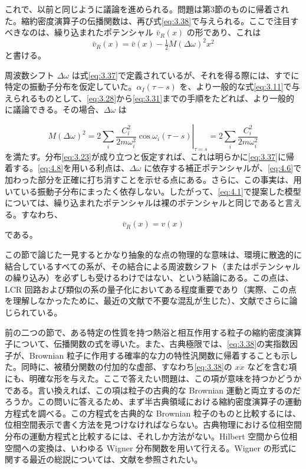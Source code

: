 これで、以前と同じように議論を進められる。問題は第3節のものに帰着された。縮約密度演算子の伝播関数は、再び式\eqref{eq:3.38}で与えられる。ここで注目すべきなのは、繰り込まれたポテンシャル $\bar v_R(x)$ の形であり、これは
\begin{equation}
\bar v_R(x)=\bar v(x)-\tfrac12 M(\Delta\omega)^2x^2
\tag{4.7}\label{eq:4.7}
\end{equation}
と書ける。

周波数シフト $\Delta\omega$ は式\eqref{eq:3.37}で定義されているが、それを得る際には、すでに特定の振動子分布を仮定していた。$\alpha_I(\tau-s)$ を、より一般的な式\eqref{eq:3.11}で与えられるものとして、\eqref{eq:3.28}から\eqref{eq:3.31}までの手順をたどれば、より一般的に議論できる。その場合、$\Delta\omega$ は

\begin{equation}
M(\Delta\omega)^2
=\left.2\sum_i\frac{C_i^2}{2m\omega_i^2}
\cos\omega_i(\tau-s)\right|_{\tau=s}
=2\sum_i\frac{C_i^2}{2m\omega_i^2}
\tag{4.8}\label{eq:4.8}
\end{equation}
を満たす。分布\eqref{eq:3.23}が成り立つと仮定すれば、これは明らかに\eqref{eq:3.37}に帰着する。\eqref{eq:4.8}を用いる利点は、$\Delta\omega$ に依存する補正ポテンシャルが、\eqref{eq:4.6}で加わった部分を正確に打ち消すことを示せる点にある。さらに、この事実は、用いている振動子分布にまったく依存しない。したがって、\eqref{eq:4.1}で提案した模型については、繰り込まれたポテンシャルは裸のポテンシャルと同じであると言える。すなわち、
\begin{equation}
\bar v_R(x)=v(x)
\tag{4.9}\label{eq:4.9}
\end{equation}
である。

この節で論じた一見するとかなり抽象的な点の物理的な意味は、環境に散逸的に結合しているすべての系が、その結合による周波数シフト（またはポテンシャルの繰り込み）を必ずしも受けるわけではない、という結論にある。この点は、LCR 回路および類似の系の量子化においてある程度重要であり（実際、この点を理解しなかったために、最近の文献で不要な混乱が生じた）、文献\cite{ref21}でさらに論じられている。

\label{sec:5}
前の二つの節で、ある特定の性質を持つ熱浴と相互作用する粒子の縮約密度演算子について、伝播関数の式を導いた。また、古典極限では、\eqref{eq:3.38}の実指数因子が、Brownian 粒子に作用する確率的な力の特性汎関数に帰着することも示した。同時に、被積分関数の付加的な虚部、すなわち\eqref{eq:3.38}の $x\dot x$ などを含む項にも、明確な形を与えた。ここで答えたい問題は、この項が意味を持つかどうかである。言い換えれば、この項は粒子の古典的な Brownian 運動と両立するのだろうか。この問いに答えるため、まず半古典領域における縮約密度演算子の運動方程式を調べる。この方程式を古典的な Brownian 粒子のものと比較するには、位相空間表示で書く方法を見つけなければならない。古典物理における位相空間分布の運動方程式と比較するには、それしか方法がない。Hilbert 空間から位相空間への変換は、いわゆる Wigner 分布関数\cite{ref29}を用いて行える。Wigner の形式に関する最近の総説については、文献\cite{ref03,ref30}を参照されたい。

